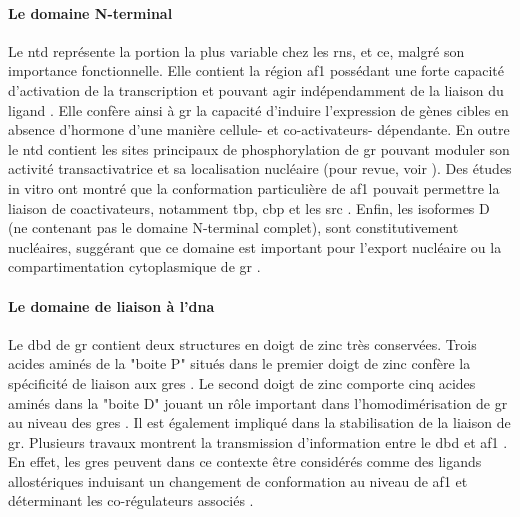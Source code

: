 \documentclass[../main.tex]{subfiles}
\begin{document}
		

		\paragraph{Le domaine N-terminal}
			Le \gls{ntd} représente la portion la plus variable chez les \glspl{rn}, et ce, malgré son importance fonctionnelle.
			Elle contient la région \gls{af1} possédant une forte capacité d'activation de la transcription et pouvant agir indépendamment de la liaison du ligand \citep{Godowski1987}.
			Elle confère ainsi à \gls{gr} la capacité d'induire l'expression de gènes cibles en absence d'hormone d'une manière cellule- et co-activateurs- dépendante.
			En outre le \gls{ntd} contient les sites principaux de phosphorylation de \gls{gr} pouvant moduler son activité transactivatrice et sa localisation nucléaire (pour revue, voir \citealp{Galliher-Beckley2009}).
			Des études in vitro ont montré que la conformation particulière de \gls{af1} pouvait permettre la liaison de coactivateurs, notamment \gls{tbp}, \gls{cbp} et les \gls{src} \citep{Kumar2005}.
			Enfin, les isoformes D (ne contenant pas le domaine N-terminal complet), sont constitutivement nucléaires, suggérant que ce domaine est important pour l'export nucléaire ou la compartimentation cytoplasmique de \gls{gr} \citep{Lu2006}.

		\paragraph{Le domaine de liaison à l'\gls{dna}}
			Le \gls{dbd} de \gls{gr} contient deux structures en doigt de zinc très conservées.
			Trois acides aminés de la "boite P" situés dans le premier doigt de zinc confère la spécificité de liaison aux \glspl{gre} \citep{Luisi1991}.
			Le second doigt de zinc comporte cinq acides aminés dans la "boite D" jouant un rôle important dans l'homodimérisation de \gls{gr} au niveau des \glspl{gre} \citep{Luisi1991}.
			Il est également impliqué dans la stabilisation de la liaison de \gls{gr}.
			Plusieurs travaux montrent la transmission d'information entre le \gls{dbd} et \gls{af1} \citep{Kumar1999}.
			En effet, les \glspl{gre} peuvent dans ce contexte être considérés comme des ligands allostériques induisant un changement de conformation au niveau de \gls{af1} et déterminant les co-régulateurs associés \citep{Lefstin1998}.
\end{document}
